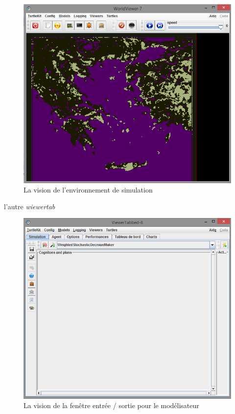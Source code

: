 \documentclass[a4paper,oneside,12 pt]{article}
\begin{document}
\begin{figure}[hbtp]
\begin{center}
 \includegraphics [scale=0.5] {worldviewer.png}
\end{center}
 \caption{La vision de l'environnement de simulation}
\end{figure}
\newpage

l'autre \textit{wiewertab} 

\begin{figure}[hbtp]
\begin{center}
 \includegraphics [scale=0.5] {viewertabbed.png}
\end{center}
 \caption{La vision de la fenêtre entrée / sortie pour le modélisateur}
\end{figure}
\end{document}
